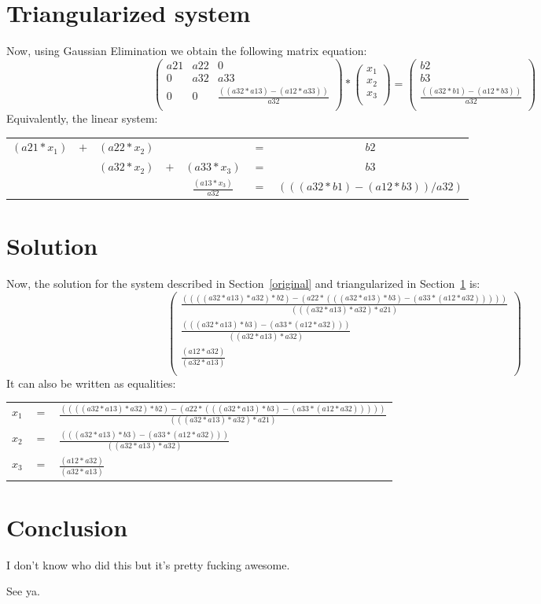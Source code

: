 \documentclass[11pt,a4paper,oneside]{article}
\newcommand\matandtabspace{
.4em
}
\newcommand\triangletab{
\begin{tabular}{ c  c  c  c  c  c  c }
  $(a21 * x_{1})$ & $+$ & $(a22 * x_{2})$ & &  & $=$ & $b2$\\[\matandtabspace]
   &  & $(a32 * x_{2})$ & $+$ & $(a33 * x_{3})$ & $=$ & $b3$\\[\matandtabspace]
   &  &  &  & $\frac{(a13 * x_{3})}{a32}$ & $=$ & $(((a32 * b1) - (a12 * b3)) / a32)$\\[\matandtabspace]
\end{tabular}
}
\newcommand\trianglemat{
\begin{pmatrix}
  a21 & a22 & 0\\[\matandtabspace]
  0 & a32 & a33\\[\matandtabspace]
  0 & 0 & \frac{((a32 * a13) - (a12 * a33))}{a32}\\[\matandtabspace]
\end{pmatrix}
}
\newcommand\trianglevec{
\begin{pmatrix}
  b2\\[\matandtabspace]
  b3\\[\matandtabspace]
  \frac{((a32 * b1) - (a12 * b3))}{a32}\\[\matandtabspace]
\end{pmatrix}
}
\newcommand\variablevec{
\begin{pmatrix}
  x_1\\[\matandtabspace]
  x_2\\[\matandtabspace]
  x_3\\[\matandtabspace]
\end{pmatrix}
}
\newcommand\solutiontab{
\begin{tabular}{ c c l }
  $x_1$ & $=$ & $\frac{((((a32 * a13) * a32) * b2) - (a22 * (((a32 * a13) * b3) - (a33 * (a12 * a32)))))}{(((a32 * a13) * a32) * a21)}$\\[\matandtabspace]
  $x_2$ & $=$ & $\frac{(((a32 * a13) * b3) - (a33 * (a12 * a32)))}{((a32 * a13) * a32)}$\\[\matandtabspace]
  $x_3$ & $=$ & $\frac{(a12 * a32)}{(a32 * a13)}$\\[\matandtabspace]
\end{tabular}
}
\newcommand\solutionmat{
\begin{pmatrix}
  \frac{((((a32 * a13) * a32) * b2) - (a22 * (((a32 * a13) * b3) - (a33 * (a12 * a32)))))}{(((a32 * a13) * a32) * a21)}\\[\matandtabspace]
  \frac{(((a32 * a13) * b3) - (a33 * (a12 * a32)))}{((a32 * a13) * a32)}\\[\matandtabspace]
  \frac{(a12 * a32)}{(a32 * a13)}\\[\matandtabspace]
\end{pmatrix}
}
\begin{document}
\section{Triangularized system}
\label{triangle}
Now, using Gaussian Elimination we obtain the following matrix equation:
\[
\trianglemat
*
\variablevec
=
\trianglevec
\]
Equivalently, the linear system:\\
\triangletab

\section{Solution}
\label{solution}
Now, the solution for the system described in Section~\ref{original} and
triangularized in Section~\ref{triangle} is:
\[ \solutionmat \]
It can also be written as equalities:\\
\solutiontab

\section{Conclusion}
I don't know who did this but it's pretty fucking awesome.
\newline

See ya.

\end{document}
